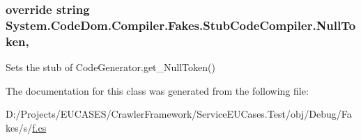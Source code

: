 \hypertarget{class_system_1_1_code_dom_1_1_compiler_1_1_fakes_1_1_stub_code_compiler_afc3eb1a89474b312e5a9aa3aae8ec884}{
\subsubsection[{Null\-Token}]{\setlength{\rightskip}{0pt plus 5cm}override string System.\-Code\-Dom.\-Compiler.\-Fakes.\-Stub\-Code\-Compiler.\-Null\-Token\hspace{0.3cm}{\ttfamily [get]}, {\ttfamily [protected]}}}\label{class_system_1_1_code_dom_1_1_compiler_1_1_fakes_1_1_stub_code_compiler_afc3eb1a89474b312e5a9aa3aae8ec884}


Sets the stub of Code\-Generator.\-get\-\_\-\-Null\-Token()



The documentation for this class was generated from the following file\-:\begin{DoxyCompactItemize}
\item 
D\-:/\-Projects/\-E\-U\-C\-A\-S\-E\-S/\-Crawler\-Framework/\-Service\-E\-U\-Cases.\-Test/obj/\-Debug/\-Fakes/s/\hyperlink{s_2f_8cs}{f.\-cs}\end{DoxyCompactItemize}
